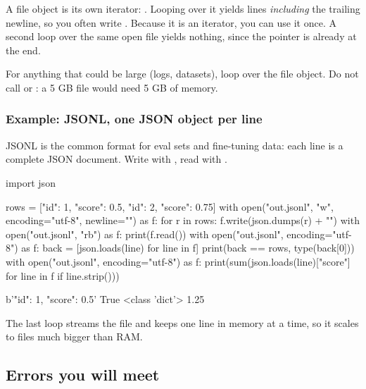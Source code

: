 \begin{typecheck}
A file object is its own iterator: . Looping over it yields  lines
\emph{including} the trailing newline, so you often write .
Because it is an iterator, you can use it once. A second loop over the same open file yields
nothing, since the pointer is already at the end.
\end{typecheck}

\begin{gamerule}
For anything that could be large (logs, datasets), loop over the file object. Do not call
 or : a 5 GB file would need 5 GB of memory.
\end{gamerule}

\subsubsection*{Example: JSONL, one JSON object per line}

JSONL is the common format for eval sets and fine-tuning data: each line is a complete JSON
document. Write with , read with .

\begin{pycode}
import json

rows = [{"id": 1, "score": 0.5}, {"id": 2, "score": 0.75}]
with open("out.jsonl", "w", encoding="utf-8", newline="\n") as f:
    for r in rows:
        f.write(json.dumps(r) + "\n")
with open("out.jsonl", "rb") as f:
    print(f.read())
with open("out.jsonl", encoding="utf-8") as f:
    back = [json.loads(line) for line in f]
print(back == rows, type(back[0]))
with open("out.jsonl", encoding="utf-8") as f:
    print(sum(json.loads(line)["score"] for line in f if line.strip()))
\end{pycode}
\begin{rawcode}
b'{"id": 1, "score": 0.5}\n'
True <class 'dict'>
1.25
\end{rawcode}

The last loop streams the file and keeps one line in memory at a time, so it scales to files much
bigger than RAM.

\subsection{Errors you will meet}

